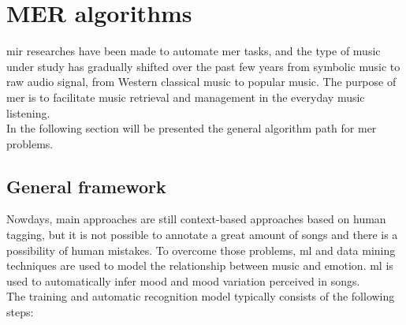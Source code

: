 \newpage
\section{MER algorithms}
\gls{mir} researches have been made to automate \gls{mer} tasks, and the type of music under study has gradually shifted over the past few years from symbolic music to raw audio signal, from Western classical music to popular music. The purpose of \gls{mer} is to facilitate music retrieval and management in the everyday music listening.
\\
In the following section will be presented the general algorithm path for \gls{mer} problems.

\subsection{General framework}
Nowdays, main approaches are still context-based approaches based on human tagging, but it is not possible to annotate a great amount of songs and there is a possibility of human mistakes. To overcome those problems, \gls{ml} and data mining techniques are used to model the relationship between music and emotion. \gls{ml} is used to automatically infer mood and mood variation perceived in songs.
\\
The training and automatic recognition model typically consists of the following steps:
